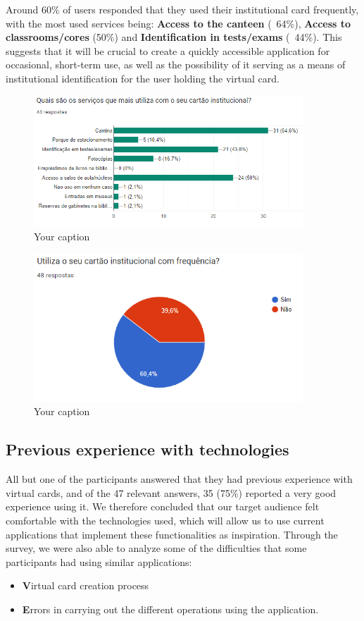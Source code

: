 \documentclass{article}
\begin{document}
Around 60\% of users responded that they used their institutional card frequently, with the most used services being: \textbf{Access to the canteen} (~64\%), \textbf{Access to classrooms/cores} (50\%) and \textbf{Identification in tests/exams} (~44\%).
This suggests that it will be crucial to create a quickly accessible application for occasional, short-term use, as well as the possibility of it serving as a means of institutional identification for the user holding the virtual card.

\begin{figure}[h]
    \centering
    \includegraphics[width=0.9\textwidth]{images/questionaire2.png}
    \caption{Your caption}
\end{figure}

\begin{figure}[h]
    \centering
    \includegraphics[width=0.9\textwidth]{images/questionaire3.png}
    \caption{Your caption}
\end{figure}

\subsection{Previous experience with technologies}

All but one of the participants answered that they had previous experience with virtual cards, and of the 47 relevant answers, 35 (75\%) reported a very good experience using it. We therefore concluded that our target audience felt comfortable with the technologies used, which will allow us to use current applications that implement these functionalities as inspiration.
Through the survey, we were also able to analyze some of the difficulties that some participants had using similar applications:
\begin{itemize}
    \item \textbf Virtual card creation process
    \item \textbf Errors in carrying out the different operations using the application.
\end{itemize}
\end{document}
